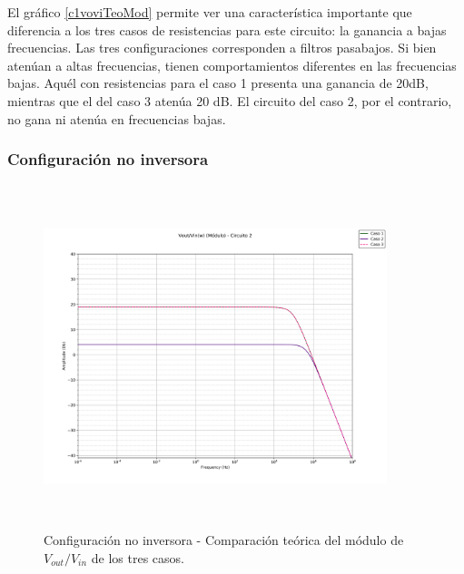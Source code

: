 El gr\'afico \ref{c1voviTeoMod} permite ver una caracter\'istica importante que diferencia a los tres casos de resistencias para este circuito: la ganancia a bajas frecuencias. Las tres configuraciones corresponden a filtros pasabajos. Si bien aten\'uan a altas frecuencias, tienen comportamientos diferentes en las frecuencias bajas. Aqu\'el con resistencias para el caso 1 presenta una ganancia de 20dB, mientras que el del caso 3 aten\'ua 20 dB. El circuito del caso 2, por el contrario, no gana ni aten\'ua en frecuencias bajas.


\subsubsection*{Configuraci\'on no inversora}

\begin{figure}[H] %
\centering
\includegraphics[width=10cm,height=10cm,keepaspectratio]{../EJ1/00GRAFICOS/teoricos/circ2voviw.png}
\caption{Configuración no inversora - Comparaci\'on te\'orica del m\'odulo de$V_{out}/V_{in}$ de los tres casos.}
\label{c2voviTeoMod}
\end{figure}

